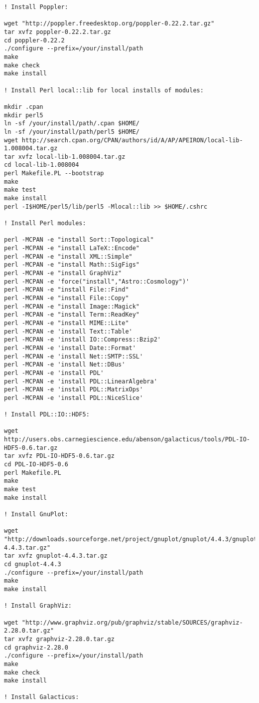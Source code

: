 \begin{lstlisting}[language=simple,stringstyle=\ttfamily,commentstyle=\itshape]
! Install Poppler:

wget "http://poppler.freedesktop.org/poppler-0.22.2.tar.gz"
tar xvfz poppler-0.22.2.tar.gz
cd poppler-0.22.2
./configure --prefix=/your/install/path
make
make check
make install

! Install Perl local::lib for local installs of modules:

mkdir .cpan
mkdir perl5
ln -sf /your/install/path/.cpan $HOME/
ln -sf /your/install/path/perl5 $HOME/
wget http://search.cpan.org/CPAN/authors/id/A/AP/APEIRON/local-lib-1.008004.tar.gz
tar xvfz local-lib-1.008004.tar.gz 
cd local-lib-1.008004
perl Makefile.PL --bootstrap
make
make test
make install
perl -I$HOME/perl5/lib/perl5 -Mlocal::lib >> $HOME/.cshrc

! Install Perl modules:

perl -MCPAN -e "install Sort::Topological"
perl -MCPAN -e "install LaTeX::Encode"
perl -MCPAN -e "install XML::Simple"
perl -MCPAN -e "install Math::SigFigs"
perl -MCPAN -e "install GraphViz"
perl -MCPAN -e 'force("install","Astro::Cosmology")'
perl -MCPAN -e "install File::Find"
perl -MCPAN -e "install File::Copy"
perl -MCPAN -e "install Image::Magick"
perl -MCPAN -e "install Term::ReadKey"
perl -MCPAN -e "install MIME::Lite"
perl -MCPAN -e 'install Text::Table'
perl -MCPAN -e 'install IO::Compress::Bzip2'
perl -MCPAN -e 'install Date::Format'
perl -MCPAN -e 'install Net::SMTP::SSL'
perl -MCPAN -e 'install Net::DBus'
perl -MCPAN -e 'install PDL'
perl -MCPAN -e 'install PDL::LinearAlgebra'
perl -MCPAN -e 'install PDL::MatrixOps'
perl -MCPAN -e 'install PDL::NiceSlice'

! Install PDL::IO::HDF5:

wget http://users.obs.carnegiescience.edu/abenson/galacticus/tools/PDL-IO-HDF5-0.6.tar.gz
tar xvfz PDL-IO-HDF5-0.6.tar.gz
cd PDL-IO-HDF5-0.6
perl Makefile.PL
make
make test
make install

! Install GnuPlot:

wget "http://downloads.sourceforge.net/project/gnuplot/gnuplot/4.4.3/gnuplot-4.4.3.tar.gz"
tar xvfz gnuplot-4.4.3.tar.gz
cd gnuplot-4.4.3
./configure --prefix=/your/install/path
make
make install

! Install GraphViz:

wget "http://www.graphviz.org/pub/graphviz/stable/SOURCES/graphviz-2.28.0.tar.gz"
tar xvfz graphviz-2.28.0.tar.gz
cd graphviz-2.28.0
./configure --prefix=/your/install/path
make
make check
make install

! Install Galacticus:


\end{lstlisting}
